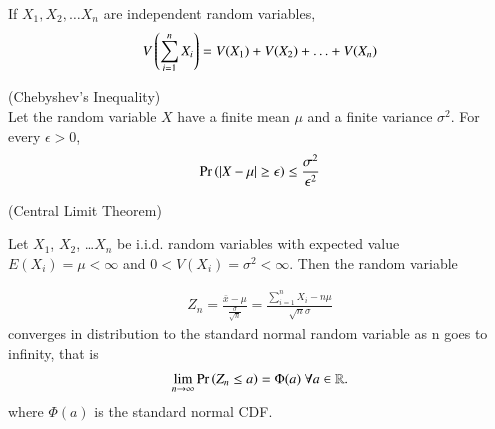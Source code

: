 \documentclass[journal,12pt,twocolumn]{IEEEtran}
\begin{document}
\begin{lemma} \label{varsum}
    If $X_1, X_2, \ldots X_n$ are independent random variables,
    \begin{align}
        V\left(\sum_{i=1}^n X_i\right) = V(X_1)+V(X_2)+\ldots +V(X_n)
    \end{align}
\end{lemma}

\begin{lemma}\label{lma4}
    (Chebyshev's Inequality)\\
Let the random variable $X$ have a finite mean $\mu$ and a finite variance $\sigma^2$. For every $\epsilon>0$, 
\begin{align}
    \Pr\left(\vert X - \mu\vert \geq \epsilon\right) \leq \frac{\sigma^2}{\epsilon^2}
\end{align}
\end{lemma}

\begin{lemma}\label{lma2}
    (Central Limit Theorem)

Let $X_1$, $X_2$, \ldots $X_n$ be i.i.d. random variables with expected value $E(X_i)=\mu < \infty$  and $0 < V(X_i)=\sigma^2 < \infty$. Then the random variable 

\begin{align}
    Z_n = \frac{\bar{x} - \mu}{\frac{\sigma}{\sqrt{n}}} = \frac{\sum_{i=1}^n X_i - n\mu}{\sqrt{n}\sigma}
\end{align}
converges in distribution to the standard normal random variable as n goes to infinity, that is
\begin{align}
    \lim_{n \to \infty}\Pr\left(Z_n \leq a\right) = \Phi(a)   \text{        }\forall a \in \mathbb{R}.
\end{align}
where $\Phi(a)$ is the standard normal CDF.
\end{lemma}
\end{document}
